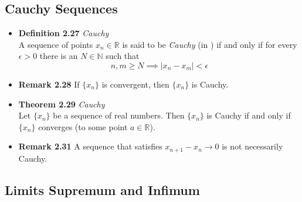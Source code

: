 \documentclass[11pt,a4paper]{article}
\begin{document}
\subsection{Cauchy Sequences}

\begin{itemize}
    \item \textbf{Definition 2.27} \emph{Cauchy} \\
        A sequence of points $x_n \in \mathbb{R}$ is said to be \emph{Cauchy} (in )
        if and only if for every $\epsilon > 0$ there is an $N \in \mathbb{N}$ such that
        \[
            n, m \geq N \implies |x_n - x_m| < \epsilon
        \]

    \item \textbf{Remark 2.28}
        If $\{x_n\}$ is convergent, then $\{x_n\}$ is Cauchy.

    \item \textbf{Theorem 2.29} \emph{Cauchy} \\
        Let $\{x_n\}$ be a sequence of real numbers.
        Then $\{x_n\}$ is Cauchy if and only if $\{x_n\}$ converges
        (to some point $a \in \mathbb{R}$).

    \item \textbf{Remark 2.31}
        A sequence that satisfies $x_{n+1} - x_n \to 0$ is not necessarily Cauchy.

\end{itemize}

\subsection{Limits Supremum and Infimum}
\end{document}

